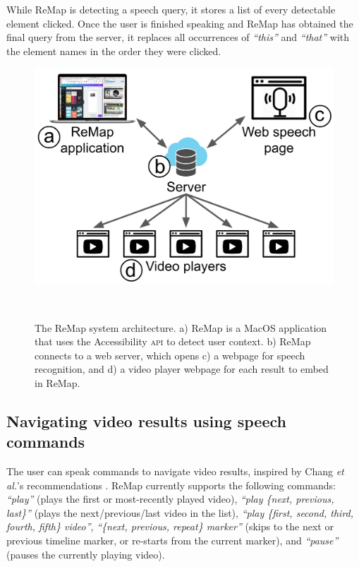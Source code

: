 While ReMap is detecting a speech query, it stores a list of every detectable element clicked. Once the user is finished speaking and ReMap has obtained the final query from the server, it replaces all occurrences of \textit{``this''} and \textit{``that''} with the element names in the order they were clicked.

\begin{figure}[b!]
\centering
  \includegraphics[width=\textwidth]{remap/figures/system.png}
  \caption{The ReMap system architecture. a) ReMap is a MacOS application that uses the Accessibility \textsc{api} to detect user context. b) ReMap connects to a web server, which opens c) a webpage for speech recognition, and d) a video player webpage for each result to embed in ReMap.}~\label{fig:remap_system}
  \vspace{-0.2in}
\end{figure}

\subsection{Navigating video results using speech commands}
The user can speak commands to navigate video results, inspired by Chang \textit{et al.}'s recommendations \cite{Chang2019}. ReMap currently supports the following commands: \textit{``play''} (plays the first or most-recently played video), \textit{``play \{next, previous, last\}''} (plays the next/previous/last video in the list), \textit{``play \{first, second, third, fourth, fifth\} video''}, \textit{``\{next, previous, repeat\} marker''} (skips to the next or previous timeline marker, or re-starts from the current marker), and \textit{``pause''} (pauses the currently playing video).


